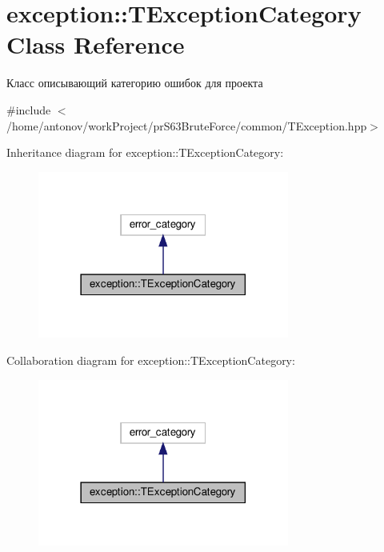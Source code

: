 \hypertarget{classexception_1_1_t_exception_category}{}\section{exception\+:\+:T\+Exception\+Category Class Reference}
\label{classexception_1_1_t_exception_category}


Класс описывающий категорию ошибок для проекта  




{\ttfamily \#include $<$/home/antonov/work\+Project/pr\+S63\+Brute\+Force/common/\+T\+Exception.\+hpp$>$}



Inheritance diagram for exception\+:\+:T\+Exception\+Category\+:\nopagebreak
\begin{figure}[H]
\begin{center}
\leavevmode
\includegraphics[width=234pt]{classexception_1_1_t_exception_category__inherit__graph}
\end{center}
\end{figure}


Collaboration diagram for exception\+:\+:T\+Exception\+Category\+:\nopagebreak
\begin{figure}[H]
\begin{center}
\leavevmode
\includegraphics[width=234pt]{classexception_1_1_t_exception_category__coll__graph}
\end{center}
\end{figure}
